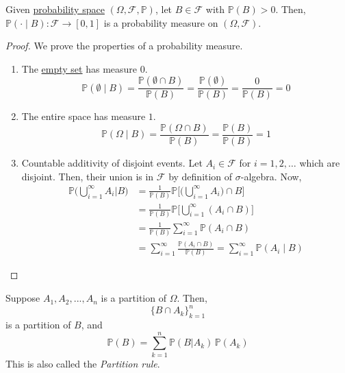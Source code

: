   \begin{theorem}
    \label{thm:conditional-probability-measure}
    Given \hyperref[def:probability-space]{probability space} $(\Omega, \mathcal{F}, \mathbb{P})$, let $B \in \mathcal{F}$ with $\mathbb{P}(B) > 0$. Then, $\mathbb{P}( \cdot \mid B): \mathcal{F} \to [0, 1]$ is a probability measure on $(\Omega, \mathcal{F})$. 
  \end{theorem}
  \begin{proof}
    We prove the properties of a probability measure. 
    \begin{enumerate}
      \item The \hyperref[st-def:empty-set]{empty set} has measure $0$. 
      \begin{equation}
        \mathbb{P}(\emptyset \mid B) = \frac{\mathbb{P}( \emptyset \cap B)}{\mathbb{P}(B)} = \frac{\mathbb{P}(\emptyset)}{\mathbb{P}(B)} = \frac{0}{\mathbb{P}(B)} = 0
      \end{equation}
      \item The entire space has measure $1$. 
      \begin{equation}
        \mathbb{P}(\Omega \mid B) =  \frac{\mathbb{P}( \Omega \cap B)}{\mathbb{P}(B)} = \frac{\mathbb{P}(B)}{\mathbb{P}(B)} = 1
      \end{equation}
      \item Countable additivity of disjoint events. Let $A_i \in \mathcal{F}$ for $i = 1, 2, \ldots$ which are disjoint. Then, their union is in $\mathcal{F}$ by definition of $\sigma$-algebra. Now, 
      \begin{align*}
        \mathbb{P}\bigg( \bigcup_{i=1}^\infty A_i \bigg| B \bigg) & = \frac{1}{\mathbb{P}(B)} \mathbb{P} \bigg[ \Big( \bigcup_{i=1}^\infty A_i \Big) \cap B \bigg] \\
        & = \frac{1}{\mathbb{P}(B)} \mathbb{P} \bigg[ \bigcup_{i=1}^\infty (A_i \cap B) \bigg] \\
        & = \frac{1}{\mathbb{P}(B)} \sum_{i=1}^\infty \mathbb{P} (A_i \cap B) \\
        & = \sum_{i=1}^\infty \frac{\mathbb{P} (A_i \cap B)}{\mathbb{P}(B)} = \sum_{i=1}^\infty \mathbb{P}(A_i \mid B) 
      \end{align*}
    \end{enumerate}
  \end{proof}

  \begin{lemma}
    \label{thm:law-of-total-probability}
    Suppose $A_1, A_2, ..., A_n$ is a partition of $\Omega$. Then, 
    \begin{equation}
      \{B \cap A_k\}_{k=1}^n
    \end{equation}
    is a partition of $B$, and 
    \begin{equation}
      \mathbb{P}(B) = \sum_{k=1}^n \mathbb{P} (B|A_k)\, \mathbb{P}(A_k)
    \end{equation}
    This is also called the \textit{Partition rule}. 
  \end{lemma}

